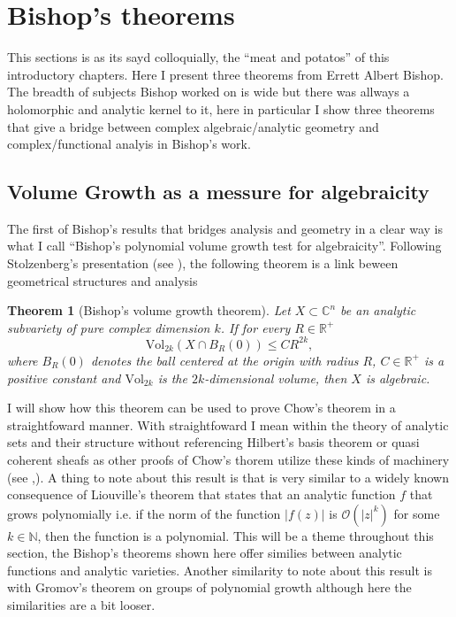 \documentclass[12pt,twoside,a4paper]{report}
\newtheorem{theorem}{Theorem}[section]
\newcommand{\nat}{\ensuremath{ \mathbb N }}
\newcommand{\re}{\ensuremath{\mathbb R }}
\newcommand{\con}{\ensuremath{\mathbb{C}^n}}
\newcommand{\osheaf}{\ensuremath{\mathcal O }}
\begin{document}
\section{Bishop's theorems}
\noindent This sections is as its sayd colloquially, the ``meat and potatos'' of this introductory chapters. Here I present three theorems from Errett Albert Bishop. The breadth of subjects Bishop worked on is wide but there was allways a holomorphic and analytic kernel to it, here in particular I show three theorems that give a bridge between complex algebraic/analytic geometry and complex/functional analyis in Bishop's work.  
\subsection{Volume Growth as a messure for algebraicity}

\noindent The first of Bishop's results that bridges analysis and geometry in a clear way is what I call ``Bishop's polynomial volume growth test for algebraicity''. Following Stolzenberg's presentation (see \cite{Stolzenberg}), the following theorem is a link beween geometrical structures and analysis
\begin{theorem}[Bishop's volume growth theorem]\label{Bishop1}
        Let $X\subset\con$ be an analytic subvariety of pure complex dimension $k$. If for every $R\in\re^+$
        \[
          \textrm{Vol}_{2k}(X\cap B_R(0))\leq CR^{2k},
        \]
        where $B_R(0)$ denotes the ball centered at the origin with radius $R$, $C\in\re^{+}$ is a positive constant
        and $\textrm{Vol}_{2k}$ is the $2k$-dimensional volume, then $X$ is algebraic.
\end{theorem}

I will show how this theorem can be used to prove Chow's theorem in a straightfoward manner. With straightfoward I mean within the theory of analytic sets and their structure without referencing Hilbert's basis theorem or quasi coherent sheafs as other proofs of Chow's thorem utilize these kinds of machinery (see \cite{GAGA},\cite{chow-proofs}). A thing to note about this result is that is very similar to a widely known consequence of Liouville's theorem that states that an analytic function $f$ that grows polynomially i.e. if the norm of the function $|f(z)|$ is $\osheaf(|z|^{k})$ for some $k\in\nat$, then the function is a polynomial. This will be a theme throughout this section, the Bishop's theorems shown here offer similies between analytic functions and analytic varieties. Another similarity to note about this result is with Gromov's theorem on groups of polynomial growth although here the similarities are a bit looser.
\end{document}
